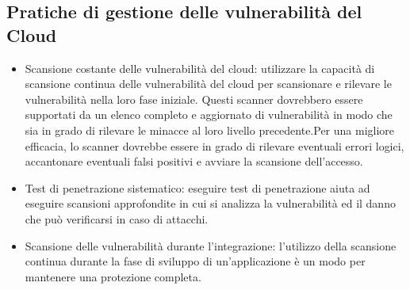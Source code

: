 \subsection{Pratiche di gestione delle vulnerabilità del Cloud}
\begin{itemize}
    \item Scansione costante delle vulnerabilità del cloud: utilizzare la capacità di scansione continua delle vulnerabilità del cloud per scansionare e rilevare le vulnerabilità nella loro fase iniziale. Questi scanner dovrebbero essere supportati da un elenco completo e aggiornato di vulnerabilità in modo che sia in grado di rilevare le minacce al loro livello precedente.Per una migliore efficacia, lo scanner dovrebbe essere in grado di rilevare eventuali errori logici, accantonare eventuali falsi positivi e avviare la scansione dell'accesso.
    \item Test di penetrazione sistematico: eseguire test di penetrazione aiuta ad eseguire scansioni approfondite in cui si analizza la vulnerabilità ed il danno che può verificarsi in caso di attacchi.
    \item Scansione delle vulnerabilità durante l’integrazione: l’utilizzo della scansione continua durante la fase di sviluppo di un’applicazione è un modo per mantenere una protezione completa.
\end{itemize}

